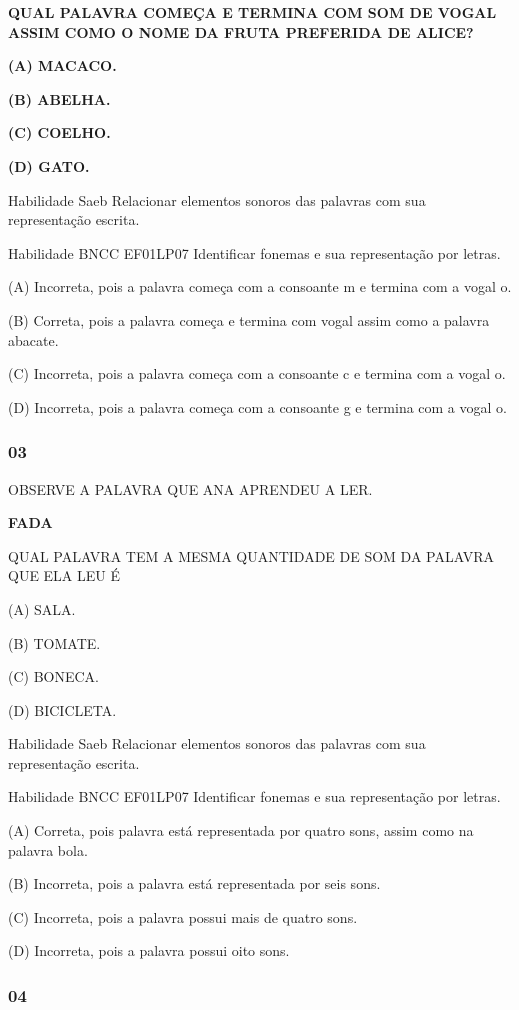 \textbf{QUAL PALAVRA COMEÇA E TERMINA COM SOM DE VOGAL ASSIM COMO O NOME
DA FRUTA PREFERIDA DE ALICE?}

\textbf{(A) MACACO.}

\textbf{(B) ABELHA.}

\textbf{(C) COELHO.}

\textbf{(D) GATO.}

Habilidade Saeb Relacionar elementos sonoros das palavras com sua
representação escrita.

Habilidade BNCC EF01LP07 Identificar fonemas e sua representação por
letras.

(A) Incorreta, pois a palavra começa com a consoante m e termina com a
vogal o.

(B) Correta, pois a palavra começa e termina com vogal assim como a
palavra abacate.

(C) Incorreta, pois a palavra começa com a consoante c e termina com a
vogal o.

(D) Incorreta, pois a palavra começa com a consoante g e termina com a
vogal o.

\subsubsection{03}\label{section-43}

OBSERVE A PALAVRA QUE ANA APRENDEU A LER.

\textbf{FADA}

QUAL PALAVRA TEM A MESMA QUANTIDADE DE SOM DA PALAVRA QUE ELA LEU É

(A) SALA.

(B) TOMATE.

(C) BONECA.

(D) BICICLETA.

Habilidade Saeb Relacionar elementos sonoros das palavras com sua
representação escrita.

Habilidade BNCC EF01LP07 Identificar fonemas e sua representação por
letras.

(A) Correta, pois palavra está representada por quatro sons, assim como
na palavra bola.

(B) Incorreta, pois a palavra está representada por seis sons.

(C) Incorreta, pois a palavra possui mais de quatro sons.

(D) Incorreta, pois a palavra possui oito sons.

\subsubsection{04}\label{section-44}

